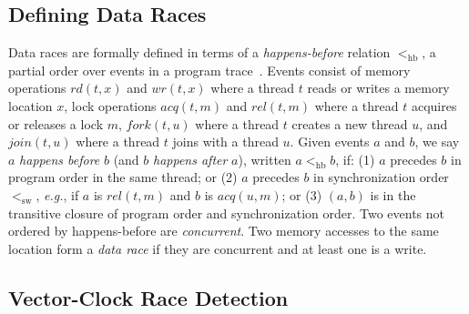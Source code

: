 \documentclass[preprint, 9pt]{sigplanconf}
\newcommand{\eg}{\textit{e.g.}\xspace}
\newcommand{\hb}[0]{<_{\mathrm{hb}}}
\newcommand{\sw}[0]{<_{\mathrm{sw}}}
\begin{document}
\subsection{Defining Data Races}
Data races are formally defined in terms of a \emph{happens-before} relation $\hb$, a partial order over events in a program trace~\cite{lamporthb}. Events consist of memory operations $\mathit{rd}(t, x)$ and $\mathit{wr}(t, x)$ where a thread $t$ reads or writes a memory location $x$, lock operations $\mathit{acq}(t, m)$ and $\mathit{rel}(t, m)$ where a thread $t$ acquires or releases a lock $m$, $\mathit{fork}(t, u)$ where a thread $t$ creates a new thread $u$, and $\mathit{join}(t, u)$ where a thread $t$ joins with a thread $u$. Given events $a$ and $b$, we say $a$ \emph{happens before} $b$ (and $b$ \emph{happens after} $a$), written $a \hb b$, if: (1) $a$ precedes $b$ in program order in the same thread; or (2) $a$ precedes $b$ in synchronization order $\sw$, \eg, if $a$ is $\mathit{rel}(t, m)$ and $b$ is $\mathit{acq}(u, m)$; or (3) $(a,b)$ is in the transitive closure of program order and synchronization order.
Two events not ordered by happens-before are \emph{concurrent}.  Two memory accesses to the same location form a \emph{data race} if they are concurrent and at least one is a write.

\subsection{Vector-Clock Race Detection}
\label{vector-clocks}


\newcommand{\bigcell}[2][c]{%
  \begin{tabular}[#1]{@{}c@{}}#2\end{tabular}}
\end{document}
